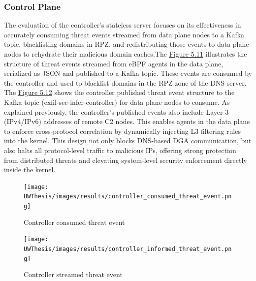 \documentclass [11pt, proquest] {uwthesis}[2020/02/24]
\begin{document}
\subsubsection{Control Plane}
The evaluation of the controller’s stateless server focuses on its effectiveness in accurately consuming threat events streamed from data plane nodes to a Kafka topic, blacklisting domains in RPZ, and redistributing those events to data plane nodes to rehydrate their malicious domain caches.The \hyperref[fig:controller_metric]{Figure 5.11} illustrates the structure of threat events streamed from eBPF agents in the data plane, serialized as JSON and published to a Kafka topic. These events are consumed by the controller and used to blacklist domains in the RPZ zone of the DNS server. The \hyperref[fig:controller_aware_metric]{Figure 5.12} shows the controller published threat event structure to the Kafka topic (exfil-sec-infer-controller) for data plane nodes to consume. As explained previously, the controller’s published events also include Layer 3 (IPv4/IPv6) addresses of remote C2 nodes. This enables agents in the data plane to enforce cross-protocol correlation by dynamically injecting L3 filtering rules into the kernel. This design not only blocks DNS-based DGA communication, but also halts all protocol-level traffic to malicious IPs, offering strong protection from distributed threats and elevating system-level security enforcement directly inside the kernel.


\begin{figure}[H]
  \centering
  \begin{minipage}[t]{0.47\textwidth}
    \centering
    \texttt{[image: UWThesis/images/results/controller\_consumed\_threat\_event.png]}
\caption{Controller consumed threat event}
  \label{fig:controller_metric}
  \end{minipage}
  \hfill
  \begin{minipage}[t]{0.47\textwidth}
    \centering
    \texttt{[image: UWThesis/images/results/controller\_informed\_threat\_event.png]}
    \caption{Controller streamed threat event}
     \label{fig:controller_aware_metric}
  \end{minipage}
\end{figure}
\end{document}
